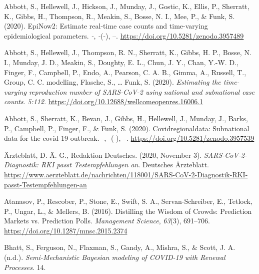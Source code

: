 \documentclass[
]{article}
\newlength{\cslhangindent}
\newlength{\cslentryspacingunit} %
\newenvironment{CSLReferences}[2] %
 {%
  \setlength{\parindent}{0pt}
  \ifodd #1
  \let\oldpar\par
  \def\par{\hangindent=\cslhangindent\oldpar}
  \fi
  \setlength{\parskip}{#2\cslentryspacingunit}
 }%
 {}
\begin{document}
\hypertarget{refs}{}
\begin{CSLReferences}{1}{0}
\leavevmode{}%
Abbott, S., Hellewell, J., Hickson, J., Munday, J., Gostic, K., Ellis, P., Sherratt, K., Gibbs, H., Thompson, R., Meakin, S., Bosse, N. I., Mee, P., \& Funk, S. (2020). EpiNow2: Estimate real-time case counts and time-varying epidemiological parameters. \emph{-}, \emph{-}(-), --. \url{https://doi.org/10.5281/zenodo.3957489}

\leavevmode{}%
Abbott, S., Hellewell, J., Thompson, R. N., Sherratt, K., Gibbs, H. P., Bosse, N. I., Munday, J. D., Meakin, S., Doughty, E. L., Chun, J. Y., Chan, Y.-W. D., Finger, F., Campbell, P., Endo, A., Pearson, C. A. B., Gimma, A., Russell, T., Group, C. C. modelling, Flasche, S., \ldots{} Funk, S. (2020). \emph{Estimating the time-varying reproduction number of {SARS}-{CoV}-2 using national and subnational case counts}. \emph{5:112}. \url{https://doi.org/10.12688/wellcomeopenres.16006.1}

\leavevmode{}%
Abbott, S., Sherratt, K., Bevan, J., Gibbs, H., Hellewell, J., Munday, J., Barks, P., Campbell, P., Finger, F., \& Funk, S. (2020). Covidregionaldata: Subnational data for the covid-19 outbreak. \emph{-}, \emph{-}(-), --. \url{https://doi.org/10.5281/zenodo.3957539}

\leavevmode{}%
Ärzteblatt, D. Ä. G., Redaktion Deutsches. (2020, November 3). \emph{SARS-CoV-2-Diagnostik: RKI passt Testempfehlungen an}. {Deutsches Ärzteblatt}. \url{https://www.aerzteblatt.de/nachrichten/118001/SARS-CoV-2-Diagnostik-RKI-passt-Testempfehlungen-an}

\leavevmode{}%
Atanasov, P., Rescober, P., Stone, E., Swift, S. A., Servan-Schreiber, E., Tetlock, P., Ungar, L., \& Mellers, B. (2016). Distilling the {Wisdom} of {Crowds}: Prediction {Markets} vs. {Prediction Polls}. \emph{Management Science}, \emph{63}(3), 691--706. \url{https://doi.org/10.1287/mnsc.2015.2374}

\leavevmode{}%
Bhatt, S., Ferguson, N., Flaxman, S., Gandy, A., Mishra, S., \& Scott, J. A. (n.d.). \emph{Semi-{Mechanistic Bayesian} modeling of {COVID}-19 with {Renewal Processes}}. 14.


\end{CSLReferences}
\end{document}
